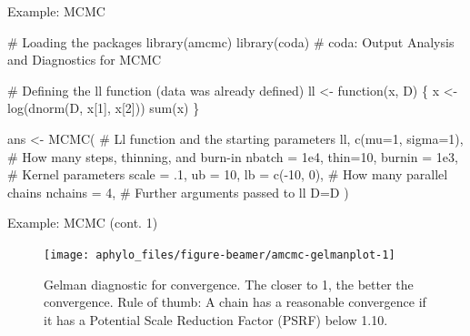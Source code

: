 \documentclass[9pt,ignorenonframetext,aspectratio=169]{beamer}
\newenvironment{Shaded}{\begin{snugshade}}{\end{snugshade}}
\newcommand{\KeywordTok}[1]{\textcolor[rgb]{0.94,0.87,0.69}{#1}}
\newcommand{\DataTypeTok}[1]{\textcolor[rgb]{0.87,0.87,0.75}{#1}}
\newcommand{\DecValTok}[1]{\textcolor[rgb]{0.86,0.86,0.80}{#1}}
\newcommand{\FloatTok}[1]{\textcolor[rgb]{0.75,0.75,0.82}{#1}}
\newcommand{\StringTok}[1]{\textcolor[rgb]{0.80,0.58,0.58}{#1}}
\newcommand{\CommentTok}[1]{\textcolor[rgb]{0.50,0.62,0.50}{#1}}
\newcommand{\ControlFlowTok}[1]{\textcolor[rgb]{0.94,0.87,0.69}{#1}}
\newcommand{\OperatorTok}[1]{\textcolor[rgb]{0.94,0.94,0.82}{#1}}
\newcommand{\NormalTok}[1]{\textcolor[rgb]{0.80,0.80,0.80}{#1}}
\begin{document}
\begin{frame}[fragile,t]{Example: MCMC}

\footnotesize

\normalsize

\footnotesize

\begin{Shaded}
\begin{Highlighting}[]
\CommentTok{# Loading the packages}
\KeywordTok{library}\NormalTok{(amcmc)}
\KeywordTok{library}\NormalTok{(coda) }\CommentTok{# coda: Output Analysis and Diagnostics for MCMC}

\CommentTok{# Defining the ll function (data was already defined)}
\NormalTok{ll <-}\StringTok{ }\ControlFlowTok{function}\NormalTok{(x, D) \{}
\NormalTok{  x <-}\StringTok{ }\KeywordTok{log}\NormalTok{(}\KeywordTok{dnorm}\NormalTok{(D, x[}\DecValTok{1}\NormalTok{], x[}\DecValTok{2}\NormalTok{]))}
  \KeywordTok{sum}\NormalTok{(x)}
\NormalTok{\}}

\NormalTok{ans <-}\StringTok{ }\KeywordTok{MCMC}\NormalTok{(}
  \CommentTok{# Ll function and the starting parameters}
\NormalTok{  ll, }\KeywordTok{c}\NormalTok{(}\DataTypeTok{mu=}\DecValTok{1}\NormalTok{, }\DataTypeTok{sigma=}\DecValTok{1}\NormalTok{),}
  \CommentTok{# How many steps, thinning, and burn-in}
  \DataTypeTok{nbatch =} \FloatTok{1e4}\NormalTok{, }\DataTypeTok{thin=}\DecValTok{10}\NormalTok{, }\DataTypeTok{burnin =} \FloatTok{1e3}\NormalTok{,}
  \CommentTok{# Kernel parameters}
  \DataTypeTok{scale =}\NormalTok{ .}\DecValTok{1}\NormalTok{, }\DataTypeTok{ub =} \DecValTok{10}\NormalTok{, }\DataTypeTok{lb =} \KeywordTok{c}\NormalTok{(}\OperatorTok{-}\DecValTok{10}\NormalTok{, }\DecValTok{0}\NormalTok{),}
  \CommentTok{# How many parallel chains}
  \DataTypeTok{nchains =} \DecValTok{4}\NormalTok{,}
  \CommentTok{# Further arguments passed to ll}
  \DataTypeTok{D=}\NormalTok{D}
\NormalTok{  )}
\end{Highlighting}
\end{Shaded}

\normalsize

\end{frame}

\begin{frame}[t]{Example: MCMC (cont. 1)}

\footnotesize

\begin{figure}

{\centering \texttt{[image: aphylo\_files/figure-beamer/amcmc-gelmanplot-1]} 

}

\caption{Gelman diagnostic for convergence. The closer to 1, the better the convergence. Rule of thumb: A chain has a reasonable convergence if it has a Potential Scale Reduction Factor (PSRF) below 1.10.}\label{fig:amcmc-gelmanplot}
\end{figure}

\normalsize

\end{frame}
\end{document}
